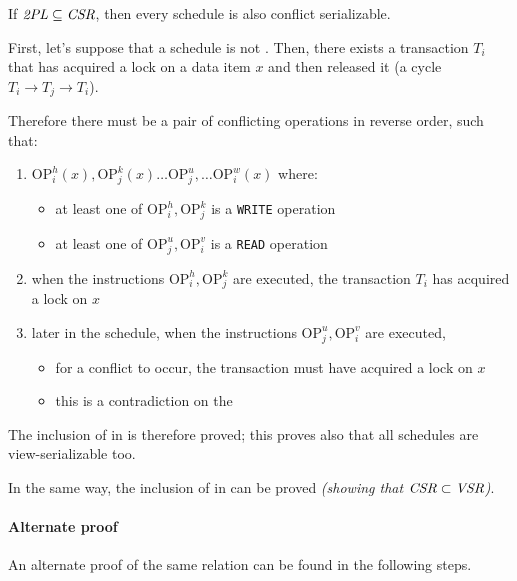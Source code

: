 \documentclass[english]{article}
\begin{document}
If \(\textit{2PL} \subseteq \textit{CSR}\), then every \TPL schedule is also conflict serializable.

\bigskip
First, let's suppose that a \TPL schedule is not \CSR.
Then, there exists a transaction \(T_i\) that has acquired a lock on a data item \(x\) and then released it (a cycle \(T_i \rightarrow T_j \rightarrow T_i\)).

Therefore there must be a pair of conflicting operations in reverse order, such that:

\begin{enumerate}
  \item \(\text{OP}_{i}^{h}(x), \text{OP}_{j}^{k}(x) \ldots \text{OP}_{j}^{u}, \ldots \text{OP}_{i}^{w}(x)\) where:
        \begin{itemize}
          \item at least one of \(\text{OP}_{i}^{h}, \text{OP}_{j}^{k}\) is a \texttt{WRITE} operation
          \item at least one of \(\text{OP}_{j}^{u}, \text{OP}_{i}^{v}\) is a \texttt{READ} operation
        \end{itemize}
  \item when the instructions \(\text{OP}_{i}^{h}, \text{OP}_{j}^{k}\) are executed, the transaction \(T_i\) has acquired a lock on \(x\)
  \item later in the schedule, when the instructions \(\text{OP}_{j}^{u}, \text{OP}_{i}^{v}\) are executed,
        \begin{itemize}
          \item for a conflict to occur, the transaction must have acquired a lock on \(x\)
          \item this is a contradiction on the \TPL
        \end{itemize}
\end{enumerate}

The inclusion of \TPL in \CSR is therefore proved;
this proves also that all \TPL schedules are view-serializable too.

In the same way, the inclusion of \TPL in \VSR can be proved \textit{(showing that \(\textit{CSR} \subset \textit{VSR}\))}.

\paragraph{Alternate proof}

An alternate proof of the same relation can be found in the following steps.
\end{document}
